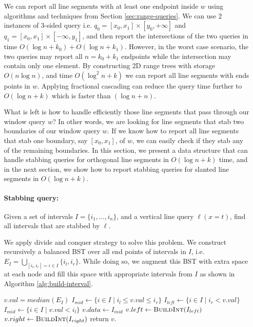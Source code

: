 We can report all line segments with at least one endpoint inside $w$ using algorithms and techniques from Section \ref{sec:range-queries}. 
%
We can use 2 instances of 3-sided query i.e. $ q_0 = [x_0, x_1] \times [y_0, +\infty ]  $ and $q_1 = [x_0, x_1] \times [-\infty,y_1]$, and then report the intersections of the two queries in time $O(\log n + k_0) + O(\log n + k_1) $. 
%
However, in the worst case scenario, the two queries may report all $n = k_0 + k_1$ endpoints while the intersection may contain only one element.
%
By constructing 2D range trees with storage $O(n\log n)$, and time $O(\log^2 n + k)$ we can report all line segments with ends points in $w$. Applying fractional cascading can reduce the query time further to $O(\log n +k)$ which is faster than $(\log n + n)$.

What is left is how to handle efficiently those line segments that pass through our window query $w$? 
%
In other words, we are looking for line segments that stab two boundaries of our window query $w$.
% 
If we know how to report all line segments that stab one boundary,  say $[x_0, x_1]$, of $w$, we can easily check if they stab any of the remaining boundaries.
%
In this section, we present a data structure that can handle stabbing queries for orthogonal line segments in $O(\log n + k)$ time, and in the next section, we show how to report stabbing queries for slanted line segments in $O(\log n + k)$. 

\paragraph{Stabbing query:} Given a set of intervals $I = \{i_1, \dots, i_n\}$, and a vertical line query $\ell (x = t)$, find all intervals that are stabbed by $\ell$. 

We apply divide and conquer strategy to solve this problem. We construct recursively a balanced BST over all end points of intervals in $I$, i.e. $E_{I} = \bigcup_{[i_l, i_r] = i \in I} \{i_l, i_r\}  $.
%
While doing so, we augment this BST with extra space at each node and fill this space with appropriate intervals from $I$ as shown in Algorithm \ref{alg:build-interval}.

\begin{algorithm}[H]
    \caption{} 
    \label{alg:build-interval}
    \begin{algorithmic}[1]
        	\State $v.val = median(E_I)$ 
          	\State $I_{mid} \leftarrow \{ i \in I \mid i_l \leq v.val \leq i_r  \}$
          	\State $I_{left} \leftarrow \{ i \in I \mid  i_r < v.val \}$
          	\State $I_{mid} \leftarrow \{ i \in I \mid  v.val < i_l  \}$
          	\State $v.data \leftarrow I_{mid}$ 
          	\State $v.left \leftarrow \textsc{BuildInt} (I_{left})$
          	\State $v.right \leftarrow \textsc{BuildInt} (I_{right})$ 	 
          \State return $v$.
        \EndFunction
    \end{algorithmic}
\end{algorithm}

